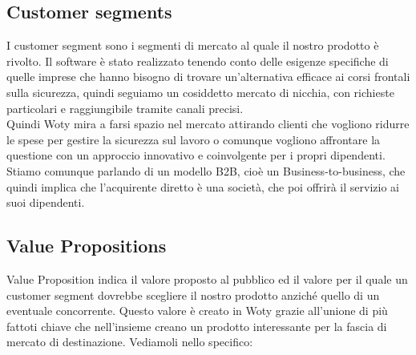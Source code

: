 \subsection{Customer segments}
I customer segment sono i segmenti di mercato al quale il nostro prodotto è rivolto. Il software è stato realizzato tenendo conto delle esigenze specifiche di quelle imprese che hanno bisogno di trovare un'alternativa efficace ai corsi frontali sulla sicurezza, quindi seguiamo un cosiddetto mercato di nicchia, con richieste particolari e raggiungibile tramite canali precisi. \\
Quindi Woty mira a farsi spazio nel mercato attirando clienti che vogliono ridurre le spese per gestire la sicurezza sul lavoro o comunque vogliono affrontare la questione con un approccio innovativo e coinvolgente per i propri dipendenti. \\
Stiamo comunque parlando di un modello B2B, cioè un Business-to-business, che quindi implica che l'acquirente diretto è una società, che poi offrirà il servizio ai suoi dipendenti.\\

\subsection{Value Propositions}
Value Proposition indica il valore proposto al pubblico ed il valore per il quale un customer segment dovrebbe scegliere il nostro prodotto anziché quello di un eventuale concorrente. Questo valore è creato in Woty grazie all'unione di più fattoti chiave che nell'insieme creano un prodotto interessante per la fascia di mercato di destinazione. Vediamoli nello specifico:

